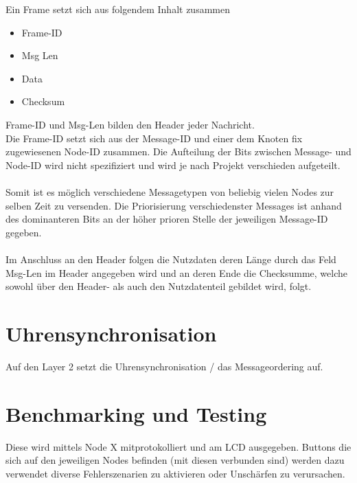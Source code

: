 \documentclass[11pt,a4paper,oneside]{report}
\begin{document}
Ein Frame setzt sich aus folgendem Inhalt zusammen
\begin{itemize}
  \item Frame-ID
  \item Msg Len
  \item Data
  \item Checksum
\end{itemize}

Frame-ID und Msg-Len bilden den Header jeder Nachricht.
\\
Die Frame-ID setzt sich aus der Message-ID und einer dem Knoten fix zugewiesenen Node-ID zusammen.
Die Aufteilung der Bits zwischen Message- und Node-ID wird nicht spezifiziert und wird je nach Projekt verschieden aufgeteilt.\\
\\
Somit ist es möglich verschiedene Messagetypen von beliebig vielen Nodes zur selben Zeit zu versenden.
Die Priorisierung verschiedenster Messages ist anhand des dominanteren Bits an der höher prioren Stelle der jeweiligen Message-ID gegeben.\\
\\
Im Anschluss an den Header folgen die Nutzdaten deren Länge durch das Feld Msg-Len im Header angegeben wird und an deren Ende die Checksumme, welche sowohl über den Header- als auch den Nutzdatenteil gebildet wird, folgt.\\

\section{Uhrensynchronisation}
Auf den Layer 2 setzt die Uhrensynchronisation / das Messageordering auf.

\section{Benchmarking und Testing}
Diese wird mittels Node X mitprotokolliert und am LCD ausgegeben.
Buttons die sich auf den jeweiligen Nodes befinden (mit diesen verbunden sind) werden dazu verwendet diverse Fehlerszenarien zu aktivieren oder Unschärfen zu verursachen.\\ 
\end{document}
